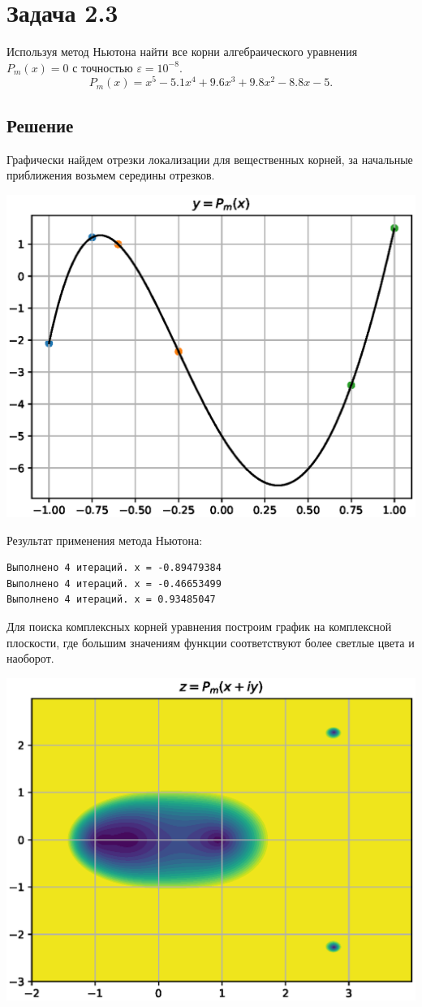 \section*{Задача 2.3}
Используя метод Ньютона найти все корни алгебраического уравнения  $P_m(x) = 0$ с точностью $\varepsilon = 10^{-8}$.
\[P_m(x) = x^5 - 5.1 x^4 + 9.6 x^3 + 9.8 x^2 - 8.8x - 5.\]

\subsection*{Решение}
Графически найдем отрезки локализации для вещественных корней, за начальные приближения возьмем середины отрезков.

\includegraphics[width=\textwidth]{231.eps}

Результат применения метода Ньютона:
\begin{verbatim}
Выполнено 4 итераций. x = -0.89479384
Выполнено 4 итераций. x = -0.46653499
Выполнено 4 итераций. x = 0.93485047
\end{verbatim}

Для поиска комплексных корней уравнения построим график на комплексной плоскости, где большим значениям функции соответствуют более светлые цвета и наоборот.

\includegraphics[width=\textwidth]{232.eps}

